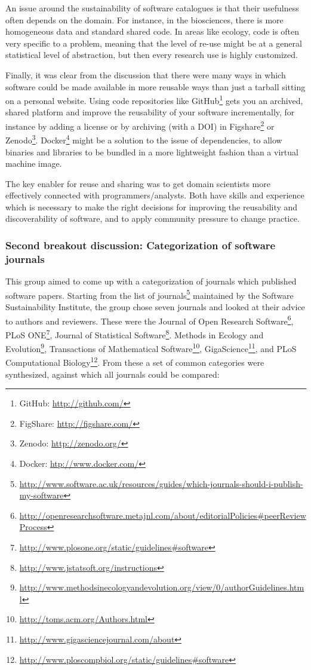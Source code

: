 \documentclass[11pt, oneside]{amsart}
\begin{document}
An issue around the sustainability of software catalogues is that their
usefulness often depends on the domain. For instance, in the biosciences, there
is more homogeneous data and standard shared code. In areas like ecology,
code is often very specific to a problem, meaning that the level of re-use might
be at a general statistical level of abstraction, but then every research
use is highly customized.

Finally, it was clear from the discussion that there were many ways in which
software could be made available in more reusable ways than just a tarball
sitting on a personal website. Using code repositories like
GitHub\footnote{GitHub: \url{http://github.com/}} gets you an archived, shared
platform and improve the reusability of your software incrementally, for
instance by adding a license or by archiving (with a DOI) in
Figshare\footnote{FigShare: \url{http://figshare.com/}} or
Zenodo\footnote{Zenodo: \url{http://zenodo.org/}}. Docker\footnote{Docker:
\url{htp://www.docker.com/}} might be a solution to the issue of dependencies,
to allow binaries and libraries to be bundled in a more lightweight fashion than
a virtual machine image.

The key enabler for reuse and sharing was to get domain scientists more
effectively connected with programmers/analysts. Both have skills and experience
which is necessary to make the right decisions for improving the reusability and
discoverability of software, and to apply community pressure to change practice.

\subsubsection{Second breakout discussion: Categorization of software journals}

This group aimed to come up with a categorization of journals which published
software papers. Starting from the list of
journals\footnote{\url{http://www.software.ac.uk/resources/guides/which-journals-should-i-publish-my-software}}
maintained by the Software Sustainability Institute, the group chose seven
journals and looked at their advice to authors and reviewers. These were the
Journal of Open Research
Software\footnote{\url{http://openresearchsoftware.metajnl.com/about/editorialPolicies\#peerReviewProcess}},
PLoS ONE\footnote{\url{http://www.plosone.org/static/guidelines\#software}},
Journal of Statistical
Software\footnote{\url{http://www.jstatsoft.org/instructions}}. Methods in
Ecology and
Evolution\footnote{\url{http://www.methodsinecologyandevolution.org/view/0/authorGuidelines.html}},
Transactions of Mathematical
Software\footnote{\url{http://toms.acm.org/Authors.html}},
GigaScience\footnote{\url{http://www.gigasciencejournal.com/about}}, and PLoS
Computational
Biology\footnote{\url{http://www.ploscompbiol.org/static/guidelines\#software}}.
%
From these a set of common categories were synthesized, against which all
journals could be compared:
\end{document}
